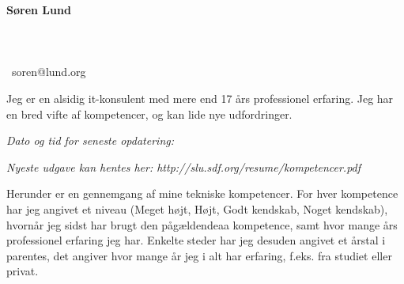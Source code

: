 \documentclass[a4paper,11pt]{article}
\newcommand\redacted{[skjult i online version]}
\newcommand\myaddressone{\redacted}
\newcommand\myaddresstwo{\redacted}
\newcommand\myphone{\redacted}
\begin{document}
\centerline{}
\centerline{}

\begin{minipage}[b]{0.30\textwidth}
  \selectfont%
  \textbf{Søren Lund} \\
  \myaddressone \\
  \myaddresstwo \\
  \myphone \\
  \Email\ soren@lund.org
\end{minipage}%
\hfill
\begin{minipage}[b]{0.30\textwidth}
  \selectfont%
  Jeg er en alsidig it-konsulent med
  mere end 17 års professionel
  erfaring. Jeg har en bred vifte af
  kompetencer, og
  kan lide nye udfordringer.
\end{minipage}

\bigskip
\centerline{\small\textit{Dato og tid for seneste opdatering: }}
\centerline{\small\textit{Nyeste udgave kan hentes her: http://slu.sdf.org/resume/kompetencer.pdf}}

\bigskip
\bigskip

\newcommand\High{Meget højt}
\newcommand\high{Højt}
\newcommand\know{Godt kendskab}
\newcommand\some{Noget kendskab}

Herunder er en gennemgang af mine tekniske kompetencer. For hver
kompetence har jeg angivet et niveau (\High, \high, \know, \some),
hvornår jeg sidst har brugt den pågældendeaa kompetence, samt hvor
mange års professionel erfaring jeg har. Enkelte steder har jeg
desuden angivet et årstal i parentes, det angiver hvor mange år jeg i
alt har erfaring, f.eks. fra studiet eller privat.
\end{document}
